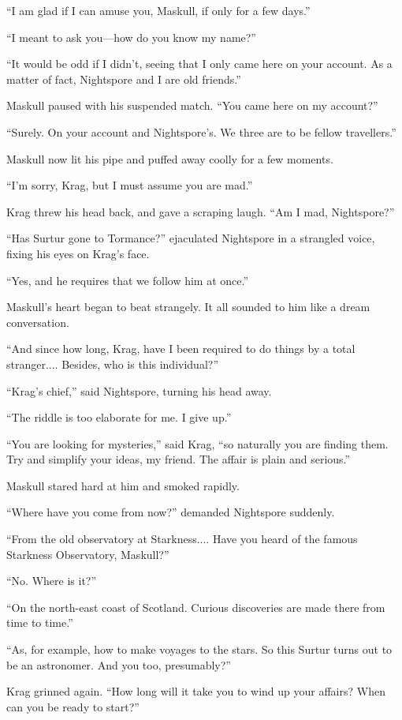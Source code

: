 ``I am glad if I can amuse you, Maskull, if only for a few days.''

``I meant to ask you—how do you know my name?''

``It would be odd if I didn't, seeing that I only came here on your account. As a matter of fact, Nightspore and I are old friends.''

Maskull paused with his suspended match. ``You came here on my account?''

``Surely. On your account and Nightspore's. We three are to be fellow travellers.''

Maskull now lit his pipe and puffed away coolly for a few moments.

``I'm sorry, Krag, but I must assume you are mad.''

Krag threw his head back, and gave a scraping laugh. ``Am I mad, Nightspore?''

``Has Surtur gone to Tormance?'' ejaculated Nightspore in a strangled voice, fixing his eyes on Krag's face.

``Yes, and he requires that we follow him at once.''

Maskull's heart began to beat strangely. It all sounded to him like a dream conversation.

``And since how long, Krag, have I been required to do things by a total stranger.... Besides, who is this individual?''

``Krag's chief,'' said Nightspore, turning his head away.

``The riddle is too elaborate for me. I give up.''

``You are looking for mysteries,'' said Krag, ``so naturally you are finding them. Try and simplify your ideas, my friend. The affair is plain and serious.''

Maskull stared hard at him and smoked rapidly.

``Where have you come from now?'' demanded Nightspore suddenly.

``From the old observatory at Starkness.... Have you heard of the famous Starkness Observatory, Maskull?''

``No. Where is it?''

``On the north-east coast of Scotland. Curious discoveries are made there from time to time.''

``As, for example, how to make voyages to the stars. So this Surtur turns out to be an astronomer. And you too, presumably?''

Krag grinned again. ``How long will it take you to wind up your affairs? When can you be ready to start?''

